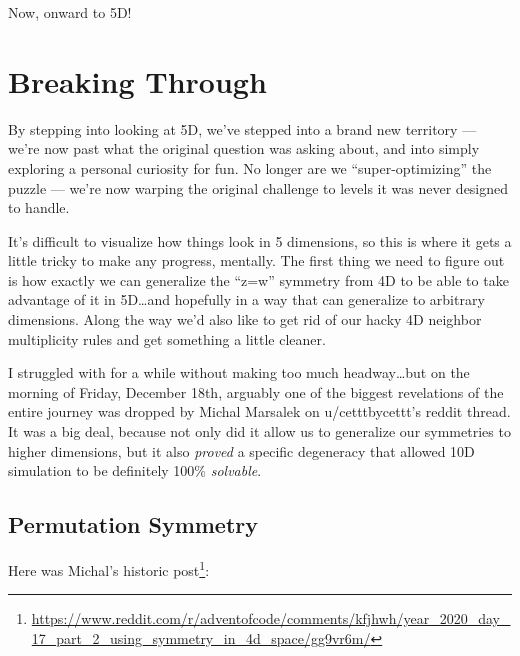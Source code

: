 \documentclass[]{article}
\renewcommand{\href}[2]{#2\footnote{\url{#1}}}
\begin{document}
Now, onward to 5D!

\hypertarget{breaking-through}{%
\section{Breaking Through}\label{breaking-through}}

By stepping into looking at 5D, we've stepped into a brand new territory ---
we're now past what the original question was asking about, and into simply
exploring a personal curiosity for fun. No longer are we ``super-optimizing''
the puzzle --- we're now warping the original challenge to levels it was never
designed to handle.

It's difficult to visualize how things look in 5 dimensions, so this is where it
gets a little tricky to make any progress, mentally. The first thing we need to
figure out is how exactly we can generalize the ``z=w'' symmetry from 4D to be
able to take advantage of it in 5D\ldots and hopefully in a way that can
generalize to arbitrary dimensions. Along the way we'd also like to get rid of
our hacky 4D neighbor multiplicity rules and get something a little cleaner.

I struggled with for a while without making too much headway\ldots but on the
morning of Friday, December 18th, arguably one of the biggest revelations of the
entire journey was dropped by Michal Marsalek on u/cetttbycettt's reddit thread.
It was a big deal, because not only did it allow us to generalize our symmetries
to higher dimensions, but it also \emph{proved} a specific degeneracy that
allowed 10D simulation to be definitely 100\% \emph{solvable}.

\hypertarget{permutation-symmetry}{%
\subsection{Permutation Symmetry}\label{permutation-symmetry}}

Here was Michal's
\href{https://www.reddit.com/r/adventofcode/comments/kfjhwh/year_2020_day_17_part_2_using_symmetry_in_4d_space/gg9vr6m/}{historic
post}:
\end{document}
